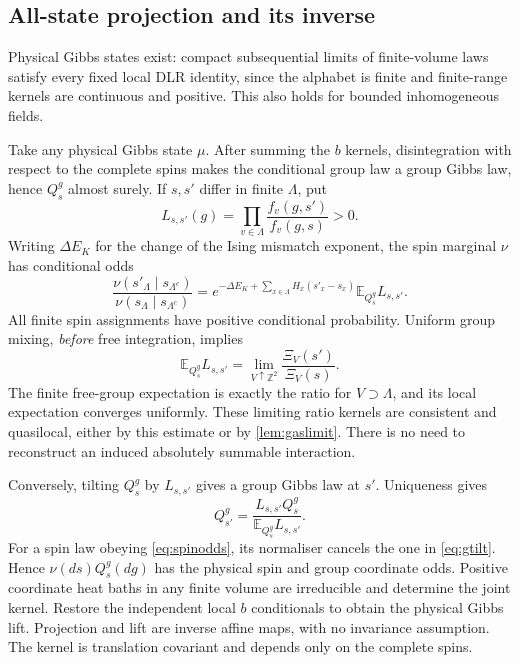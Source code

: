 \documentclass[11pt,reqno]{amsart}
\numberwithin{equation}{section}
\theoremstyle{definition}
\theoremstyle{remark}
\newcommand{\Z}{\mathbb Z}
\newcommand{\E}{\mathbb E}
\begin{document}
\subsection{All-state projection and its inverse}\label{sec:allprojection}
Physical Gibbs states exist: compact subsequential limits of finite-volume laws satisfy every fixed local DLR identity, since the alphabet is finite and finite-range kernels are continuous and positive. This also holds for bounded inhomogeneous fields.

Take any physical Gibbs state $\mu$. After summing the $b$ kernels, disintegration with respect to the complete spins makes the conditional group law a group Gibbs law, hence $Q_s^g$ almost surely. If $s,s'$ differ in finite $\Lambda$, put
\[
 L_{s,s'}(g)=\prod_{v\in\Lambda}\frac{f_v(g,s')}{f_v(g,s)}>0.
\]
Writing $\Delta E_K$ for the change of the Ising mismatch exponent, the spin marginal $\nu$ has conditional odds
\begin{equation}\label{eq:spinodds}
 \frac{\nu(s'_\Lambda\mid s_{\Lambda^c})}{\nu(s_\Lambda\mid s_{\Lambda^c})}
 =e^{-\Delta E_K+\sum_{x\in\Lambda}H_x(s'_x-s_x)}\E_{Q_s^g}L_{s,s'}.
\end{equation}
All finite spin assignments have positive conditional probability. Uniform group mixing, \emph{before} free integration, implies
\begin{equation}\label{eq:ratios}
 \E_{Q_s^g}L_{s,s'}=\lim_{V\uparrow\Z^2}\frac{\Xi_V(s')}{\Xi_V(s)}.
\end{equation}
The finite free-group expectation is exactly the ratio for $V\supset\Lambda$, and its local expectation converges uniformly. These limiting ratio kernels are consistent and quasilocal, either by this estimate or by \cref{lem:gaslimit}. There is no need to reconstruct an induced absolutely summable interaction.

Conversely, tilting $Q_s^g$ by $L_{s,s'}$ gives a group Gibbs law at $s'$. Uniqueness gives
\begin{equation}\label{eq:gtilt}
 Q_{s'}^g=\frac{L_{s,s'}Q_s^g}{\E_{Q_s^g}L_{s,s'}}.
\end{equation}
For a spin law obeying \eqref{eq:spinodds}, its normaliser cancels the one in \eqref{eq:gtilt}. Hence $\nu(ds)Q_s^g(dg)$ has the physical spin and group coordinate odds. Positive coordinate heat baths in any finite volume are irreducible and determine the joint kernel. Restore the independent local $b$ conditionals to obtain the physical Gibbs lift. Projection and lift are inverse affine maps, with no invariance assumption. The kernel is translation covariant and depends only on the complete spins.
\end{document}
